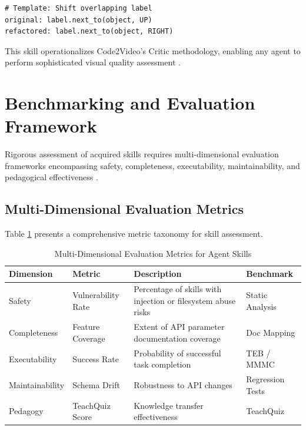 \documentclass[11pt,a4paper]{article}
\begin{document}
\begin{verbatim}
# Template: Shift overlapping label
original: label.next_to(object, UP)
refactored: label.next_to(object, RIGHT)
\end{verbatim}

This skill operationalizes Code2Video's Critic methodology, enabling any agent to perform sophisticated visual quality assessment \cite{github2024code2video, openreview2024code2video}.

\section{Benchmarking and Evaluation Framework}

Rigorous assessment of acquired skills requires multi-dimensional evaluation frameworks encompassing safety, completeness, executability, maintainability, and pedagogical effectiveness \cite{alphaxiv2024skills, huggingface2024consolidation}.

\subsection{Multi-Dimensional Evaluation Metrics}

Table \ref{tab:evaluation} presents a comprehensive metric taxonomy for skill assessment.

\begin{table}[htp]
\centering
\caption{Multi-Dimensional Evaluation Metrics for Agent Skills}
\label{tab:evaluation}
\begin{tabular}{@{}p{2.5cm}p{3cm}p{5cm}p{3cm}@{}}
\toprule
\textbf{Dimension} & \textbf{Metric} & \textbf{Description} & \textbf{Benchmark} \\
\midrule
Safety & Vulnerability Rate & Percentage of skills with injection or filesystem abuse risks \cite{alphaxiv2024skills, researchgate2024agentskills} & Static Analysis \\
Completeness & Feature Coverage & Extent of API parameter documentation coverage \cite{huggingface2024consolidation, mintlify2024skillmd} & Doc Mapping \\
Executability & Success Rate & Probability of successful task completion \cite{researchgate2024agentskills, teaproject2024} & TEB / MMMC \\
Maintainability & Schema Drift & Robustness to API changes \cite{huggingface2024consolidation, lobehub2024daoskills} & Regression Tests \\
Pedagogy & TeachQuiz Score & Knowledge transfer effectiveness \cite{arxiv2024code2video, github2024code2video} & TeachQuiz \\
\bottomrule
\end{tabular}
\end{table}
\end{document}

